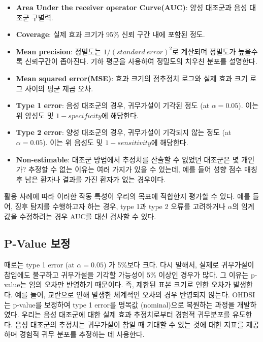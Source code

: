 \documentclass[10.5pt]{book}
\providecommand{\tightlist}{%
  \setlength{\itemsep}{0pt}\setlength{\parskip}{0pt}}
\theoremstyle{definition}
\theoremstyle{definition}
\theoremstyle{definition}
\theoremstyle{remark}
\begin{document}
\begin{itemize}
\tightlist
\item
  \textbf{Area Under the receiver operator Curve(AUC)}: 양성 대조군과
  음성 대조군 구별력.
\item
  \textbf{Coverage}: 실제 효과 크기가 95\% 신뢰 구간 내에 포함된 정도.
\item
  \textbf{Mean precision}: 정밀도는 \(1 / (standard \ error) ^ 2\)로
  계산되며 정밀도가 높을수록 신뢰구간이 좁아진다. 기하 평균을 사용하여
  정밀도의 치우친 분포를 설명한다.
\item
  \textbf{Mean squared error(MSE)}: 효과 크기의 점추정치 로그와 실제
  효과 크기 로그 사이의 평균 제곱 오차.
\item
  \textbf{Type 1 error}: 음성 대조군의 경우, 귀무가설이 기각된 정도 (at
  \(\alpha = 0.05\)). 이는 위 양성도 및 \(1 - specificity\)에 해당한다.
\item
  \textbf{Type 2 error}: 양성 대조군의 경우, 귀무가설이 기각되지 않는
  정도 (at \(\alpha = 0.05\)). 이는 위 음성도 및 \(1 - sensitivity\)에
  해당한다.
\item
  \textbf{Non-estimable}: 대조군 방법에서 추정치를 산출할 수 없었던
  대조군은 몇 개인가? 추정할 수 없는 이유는 여러 가지가 있을 수 있는데,
  예를 들어 성향 점수 매칭 후 남은 환자나 결과를 가진 환자가 없는
  경우이다.
\end{itemize}

활용 사례에 따라 이러한 작동 특성이 우리의 목표에 적합한지 평가할 수
있다. 예를 들어, 징후 탐지를 수행하고자 하는 경우, type 1과 type 2
오류를 고려하거나 \(\alpha\)의 임계 값을 수정하려는 경우 AUC를 대신
검사할 수 있다.

\subsection{P-Value 보정}\label{p-value-}

 

때로는 type 1 error (at \(\alpha = 0.05\)) 가 5\%보다 크다. 다시 말해서,
실제로 귀무가설이 참임에도 불구하고 귀무가설을 기각할 가능성이 5\%
이상인 경우가 많다. 그 이유는 p-value는 임의 오차만 반영하기 때문이다.
즉, 제한된 표본 크기로 인한 오차가 발생한다. 예를 들어, 교란으로 인해
발생한 체계적인 오차의 경우 반영되지 않는다. OHDSI는 p-value를 보정하여
type 1 error를 명목값 (nominal)으로 복원하는 과정을 개발하였다.
\citep{schuemie_2014} 우리는 음성 대조군에 대한 실제 효과 추정치로부터
경험적 귀무분포를 유도한다. 음성 대조군의 추정치는 귀무가설이 참일 때
기대할 수 있는 것에 대한 지표를 제공하며 경험적 귀무 분포를 추정하는 데
사용한다.
\end{document}
